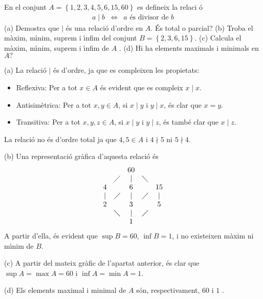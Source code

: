 \begin{exercici}
En el conjunt $A=\left\{ 1,2,3,4,5,6,15,60\right\} $ es defineix la relaci%
\'{o}%
\begin{equation*}
\begin{array}{ccc}
a\mid b & \Longleftrightarrow & a\text{ \'{e}s divisor de }b%
\end{array}%
\end{equation*}%
(a) Demostra que $\mid $ \'{e}s una relaci\'{o} d'ordre en $A$. \'{E}s total
o parcial? (b) Troba el m\`{a}xim, m\'{\i}nim, suprem i \'{\i}nfim del
conjunt $B=\left\{ 2,3,6,15\right\} $. (c) Calcula el m\`{a}xim, m\'{\i}nim,
suprem i \'{\i}nfim de $A$ . (d) Hi ha elements maximals i minimals en $A?$
\end{exercici}

\begin{solucio}
(a) La relaci\'{o} $\mid $ \'{e}s d'ordre, ja que es compleixen les
propietats:

\begin{itemize}
\item Reflexiva: Per a tot $x\in A$ \'{e}s evident que es compleix $x\mid x$.

\item Antisim\`{e}trica: Per a tot $x,y\in A$, si $x\mid y$ i $y\mid x$,
\'{e}s clar que $x=y$.

\item Transitiva: Per a tot $x,y,z\in A$, si $x\mid y$ i $y\mid z$, \'{e}s
tamb\'{e} clar que $x\mid z$.
\end{itemize}

La relaci\'{o} no \'{e}s d'ordre total ja que $4,5\in A$ i $4\nmid 5$ ni $%
5\nmid 4$.

(b) Una representaci\'{o} gr\`{a}fica d'aquesta relaci\'{o} \'{e}s%
\begin{equation*}
\begin{array}{ccccc}
&  & 60 &  &  \\
& \diagup & | & \diagdown &  \\
4 &  & 6 &  & 15 \\
| & \diagup & | & \diagup & | \\
2 &  & 3 &  & 5 \\
& \diagdown & | & \diagup &  \\
&  & 1 &  &
\end{array}%
\end{equation*}%
A partir d'ella, \'{e}s evident que $\sup B=60$, $\inf B=1$, i no existeixen
m\`{a}xim ni m\'{\i}nim de $B$.

(c) A partir del mateix gr\`{a}fic de l'apartat anterior, \'{e}s clar que $%
\sup A=\max A=60$ i $\inf A=\min A=1$.

(d) Els elements maximal i minimal de $A$ s\'{o}n, respectivament, $60$ i $1$%
.
\end{solucio}

